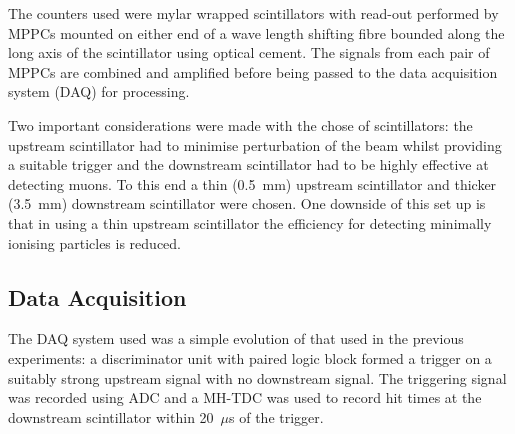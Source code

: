 The counters used were mylar wrapped scintillators with read-out performed by MPPCs mounted on either end of a wave length shifting fibre bounded along the long axis of the scintillator using optical cement. The signals from each pair of MPPCs are combined and amplified before being passed to the data acquisition system (DAQ) for processing.

Two important considerations were made with the chose of scintillators: the upstream scintillator had to minimise perturbation of the beam whilst providing a suitable trigger and the downstream scintillator had to be highly effective at detecting muons. To this end a thin (0.5~mm) upstream scintillator and thicker (3.5~mm) downstream scintillator were chosen. One downside of this set up is that in using a thin upstream scintillator the efficiency for detecting minimally ionising particles is reduced.

\subsection{Data Acquisition} %
\label{sub:data_acquisition}
The DAQ system used was a simple evolution of that used in the previous experiments: a discriminator unit with paired logic block formed a trigger on a suitably strong upstream signal with no downstream signal. The triggering signal was recorded using ADC and a MH-TDC was used to record hit times at the downstream scintillator within 20~\( \mu \)s of the trigger.

% 
% 

